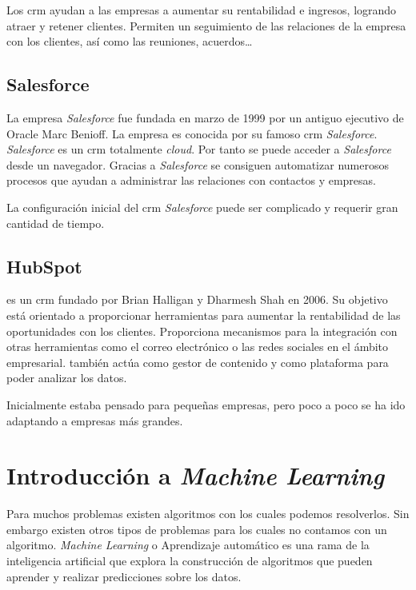 Los \acrshort{crm} ayudan a las empresas a aumentar su rentabilidad e ingresos, logrando atraer y retener clientes. 
Permiten un seguimiento de las relaciones de la empresa con los clientes, así como las reuniones, acuerdos\ldots


\subsection{Salesforce}
La empresa \textit{Salesforce} fue fundada en marzo de 1999 por un antiguo ejecutivo de Oracle Marc Benioff. La empresa es conocida por su famoso \acrshort{crm}
\textit{Salesforce}. \textit{Salesforce} es un \acrshort{crm} totalmente \textit{cloud}. Por tanto se puede acceder a \textit{Salesforce} desde un navegador. Gracias a \textit{Salesforce} se consiguen automatizar numerosos procesos que ayudan a administrar las relaciones con contactos y empresas.

La configuración inicial del \acrshort{crm} \textit{Salesforce} puede ser complicado y requerir gran cantidad de tiempo.


\subsection{HubSpot}

\hs{} es un \acrshort{crm} fundado por Brian Halligan y Dharmesh Shah en 2006. Su objetivo está orientado a proporcionar herramientas para aumentar la rentabilidad de las oportunidades con los clientes. Proporciona mecanismos para la integración con otras herramientas como el correo electrónico o las redes sociales en el ámbito empresarial. \hs{} también actúa como gestor de contenido y como plataforma para poder analizar los datos.

Inicialmente estaba pensado para pequeñas empresas, pero poco a poco se ha ido adaptando a empresas más grandes.


\section{Introducción a \textit{Machine Learning}}

Para muchos problemas existen algoritmos con los cuales podemos resolverlos. Sin embargo existen otros tipos de problemas para los cuales no contamos con un algoritmo. 
\textit{Machine Learning} o Aprendizaje automático es una rama de la inteligencia artificial que explora la construcción de algoritmos que pueden aprender y realizar predicciones sobre los datos.



